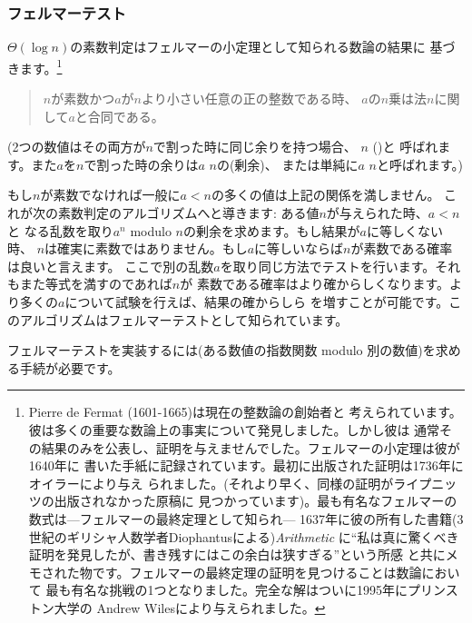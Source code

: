 \subsubsection*{フェルマーテスト}



\( \Theta(\log n) \)の素数判定はフェルマーの小定理として知られる数論の結果に
基づきます。\footnote{Pierre de Fermat (1601-1665)は現在の整数論の創始者と
考えられています。彼は多くの重要な数論上の事実について発見しました。しかし彼は
通常その結果のみを公表し、証明を与えませんでした。フェルマーの小定理は彼が1640年に
書いた手紙に記録されています。最初に出版された証明は1736年にオイラーにより与え
られました。(それより早く、同様の証明がライプニッツの出版されなかった原稿に
見つかっています)。最も有名なフェルマーの数式は---フェルマーの最終定理として知られ---
1637年に彼の所有した書籍(3世紀のギリシャ人数学者Diophantusによる)\textit{Arithmetic}
に``私は真に驚くべき証明を発見したが、書き残すにはこの余白は狭すぎる''という所感
と共にメモされた物です。フェルマーの最終定理の証明を見つけることは数論において
最も有名な挑戦の1つとなりました。完全な解はついに1995年にプリンストン大学の
Andrew Wilesにより与えられました。}

\begin{quote}
 \( n \)が素数かつ\( a \)が\( n \)より小さい任意の正の整数である時、
\( a \)の\( n \)乗は法\( n \)に関して\( a \)と合同である。
\end{quote}

\noindent
(2つの数値はその両方が\( n \)で割った時に同じ余りを持つ場合、 \( n \)
()と
呼ばれます。また\( a \)を\( n \)で割った時の余りは\( a \)  \( n \)の(剰余)、
または単純に\( a \)  \( n \)と呼ばれます。)


もし\( n \)が素数でなければ一般に\( a < n \)の多くの値は上記の関係を満しません。
これが次の素数判定のアルゴリズムへと導きます: ある値\( n \)が与えられた時、\( a < n \)と
なる乱数を取り\( a^n \) modulo \( n \)の剰余を求めます。もし結果が\( a \)に等しくない時、
\( n \)は確実に素数ではありません。もし\( a \)に等しいならば\( n \)が素数である確率は良いと言えます。
ここで別の乱数\( a \)を取り同じ方法でテストを行います。それもまた等式を満すのであれば\( n \)が
素数である確率はより確からしくなります。より多くの\( a \)について試験を行えば、結果の確からしら
を増すことが可能です。このアルゴリズムはフェルマーテストとして知られています。


フェルマーテストを実装するには(ある数値の指数関数 modulo 別の数値)を求める手続が必要です。

